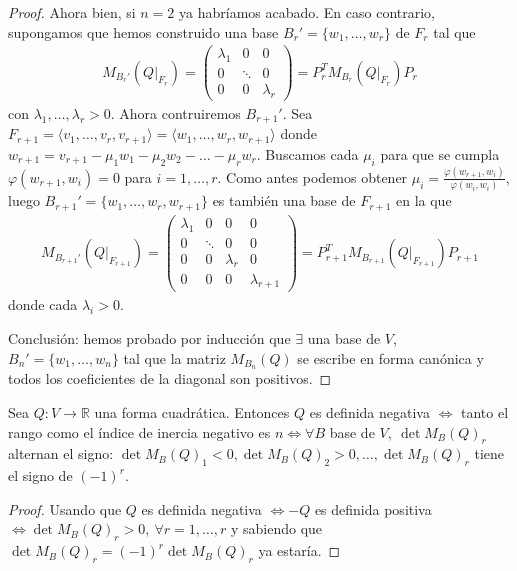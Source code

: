 \documentclass[14pt]{book}
\begin{document}
\begin{proof}
 	Ahora bien, si $n = 2$ ya habríamos acabado. En caso contrario, supongamos que hemos construido una base $B_r' = \{w_1, \dots, w_r\}$ de $F_r$ tal que
 	\begin{align*}
 	M_{B_r'}(Q\vert_{F_r}) = \left(\begin{array}{ccc}
 		\lambda_1 & 0 & 0 \\
 		0 & \ddots & 0 \\
 		0 & 0 & \lambda_r
 	\end{array}\right) = P_r^T M_{B_r}(Q\vert_{F_r}) P_r
	 \end{align*}
	 con $\lambda_1, \dots, \lambda_r > 0$. Ahora contruiremos $B_{r+ 1}'$. Sea $F_{r+1} = \langle v_1, \dots, v_r, v_{r+1}\rangle= \langle w_1, \dots, w_r, w_{r+1}\rangle$ donde $w_{r+1} = v_{r+1} - \mu_1w_1 - \mu_2 w_2 - \dots - \mu_r w_r$. Buscamos cada $\mu_i$ para que se cumpla $\varphi(w_{r+1}, w_i) = 0$ para $i = 1, \dots, r$. Como antes podemos obtener $\mu_i = \frac{\varphi(w_{r+1}, w_i)}{\varphi(w_i, w_i)}$, luego $B_{r+1}' = \{w_1, \dots, w_r, w_{r+1}\}$ es también una base de $F_{r+1}$ en la que
	 \begin{align*}
	 	M_{B_{r+1}'}(Q\vert_{F_{r+1}}) = \left(\begin{array}{cccc}
	 	\lambda_1 & 0 & 0 & 0\\
	 	0 & \ddots & 0 & 0\\
	 	0 & 0 & \lambda_r & 0 \\
	 	0 & 0 & 0 & \lambda_{r+1}
	 	\end{array}\right) = P_{r+1}^T M_{B_{r+1}}(Q\vert_{F_{r+1}}) P_{r+1}
	 \end{align*}
	 donde cada $\lambda_i > 0$.
	 
	 Conclusión: hemos probado por inducción que $\exists$ una base de $V$, $B_n' = \{w_1, \dots, w_n\}$ tal que la matriz $M_{B_n}(Q)$ se escribe en forma canónica y todos los coeficientes de la diagonal son positivos.
\end{proof}

\begin{tm}
	Sea $Q: V \to \mathbb{R}$ una forma cuadrática. Entonces $Q$ es definida negativa $\iff$ tanto el rango como el índice de inercia negativo es $n \iff \forall B$ base de $V,\ \det M_B(Q)_r$ alternan el signo: $\det M_B(Q)_1 < 0, \det M_B(Q)_2 > 0, \dots, \det M_B(Q)_r$ tiene el signo de $(-1)^r$.
\end{tm}

\begin{proof}
	Usando que $Q$ es definida negativa $\iff -Q$ es definida positiva $\iff \det M_B(Q)_r > 0,\ \forall r = 1, \dots, r$ y sabiendo que $\det M_B(Q)_r = (-1)^r\det M_B(Q)_r$ ya estaría.
\end{proof}
\end{document}

